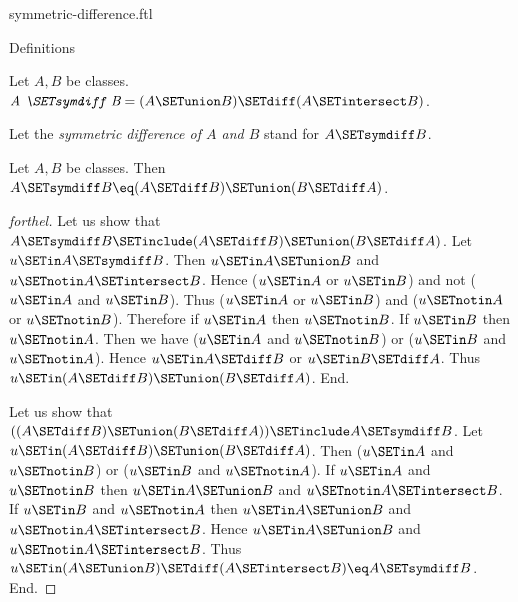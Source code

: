 \documentclass{naproche-library}
\begin{document}
\begin{smodule}[title=Symmetric Difference]{symmetric-difference.ftl}

\begin{sfragment}{Definitions}
  \begin{definition}[forthel,id=FOUNDATIONS_03_7457594151010304]
    Let $A, B$ be classes.
    $\emph{A \SETsymdiff B} = (A \SETunion B) \SETdiff (A \SETintersect B)$.

    Let the \emph{symmetric difference of $A$ and $B$} stand for $A \SETsymdiff B$.
  \end{definition}

  \begin{proposition}[forthel,id=FOUNDATIONS_03_4886447211413504]
    Let $A, B$ be classes.
    Then $A \SETsymdiff B \eq (A \SETdiff B) \SETunion (B \SETdiff A)$.
  \end{proposition}
  \begin{proof}[forthel]
    Let us show that $A \SETsymdiff B \SETinclude (A \SETdiff B) \SETunion (B \SETdiff A)$.
      Let $u \SETin A \SETsymdiff B$.
      Then $u \SETin A \SETunion B$ and $u \SETnotin A \SETintersect B$.
      Hence ($u \SETin A$ or $u \SETin B$) and not ($u \SETin A$ and $u \SETin B$).
      Thus ($u \SETin A$ or $u \SETin B$) and ($u \SETnotin A$ or $u \SETnotin B$).
      Therefore if $u \SETin A$ then $u \SETnotin B$.
      If $u \SETin B$ then $u \SETnotin A$.
      Then we have ($u \SETin A$ and $u \SETnotin B$) or ($u \SETin B$ and $u \SETnotin A$).
      Hence $u \SETin A \SETdiff B$ or $u \SETin B \SETdiff A$.
      Thus $u \SETin (A \SETdiff B) \SETunion (B \SETdiff A)$.
    End.

    Let us show that $((A \SETdiff B) \SETunion (B \SETdiff A)) \SETinclude A \SETsymdiff B$. %
      Let $u \SETin (A \SETdiff B) \SETunion (B \SETdiff A)$.
      Then ($u \SETin A$ and $u \SETnotin B$) or ($u \SETin B$ and $u \SETnotin A$).
      If $u \SETin A$ and $u \SETnotin B$ then $u \SETin A \SETunion B$ and $u \SETnotin A \SETintersect B$.
      If $u \SETin B$ and $u \SETnotin A$ then $u \SETin A \SETunion B$ and $u \SETnotin A \SETintersect B$.
      Hence $u \SETin A \SETunion B$ and $u \SETnotin A \SETintersect B$.
      Thus $u \SETin (A \SETunion B) \SETdiff (A \SETintersect B) \eq A \SETsymdiff B$.
    End.
  \end{proof}
\end{sfragment}


\end{smodule}
\end{document}
